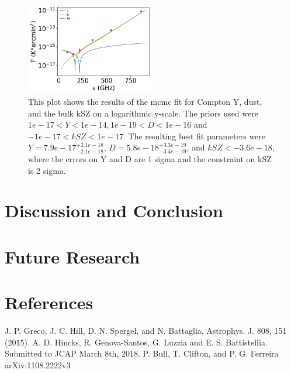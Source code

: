 \documentclass{princeton_astro_thesis}
\begin{document}
\begin{figure}[h]
\centering
\includegraphics[width=0.5\textwidth]{../redmapper_apfluxes_kSZfitlog.png}
\caption{This plot shows  the results of the mcmc fit for Compton Y, dust, and the bulk kSZ on a logarithmic y-scale. The priors used were $ 1e-17 < Y < 1e-14, 1e-19< D < 1e-16$ and $-1e-17 < kSZ <1e-17.$ The resulting best fit parameters were $Y=7.9e-17^{+2.1e-18}_{-2.1e-18}$, $D=5.8e-18^{+3.3e-19}_{-3.4e-19}$, and $kSZ<-3.6e-18$, where the errors on Y and D are 1 sigma and the constraint on kSZ is 2 sigma.} %
\end{figure}


\chapter{Discussion and Conclusion}

\chapter{Future Research}

\chapter{References}
J. P. Greco, J. C. Hill, D. N. Spergel, and N. Battaglia,
Astrophys. J. 808, 151 (2015). \newline
A. D. Hincks, R. Genova-Santos, G. Luzzia and
E. S. Battistellia. Submitted to JCAP March 8th, 2018. \newline
P. Bull, T. Clifton, and P. G. Ferreira arXiv:1108.2222v3 
\end{document}
